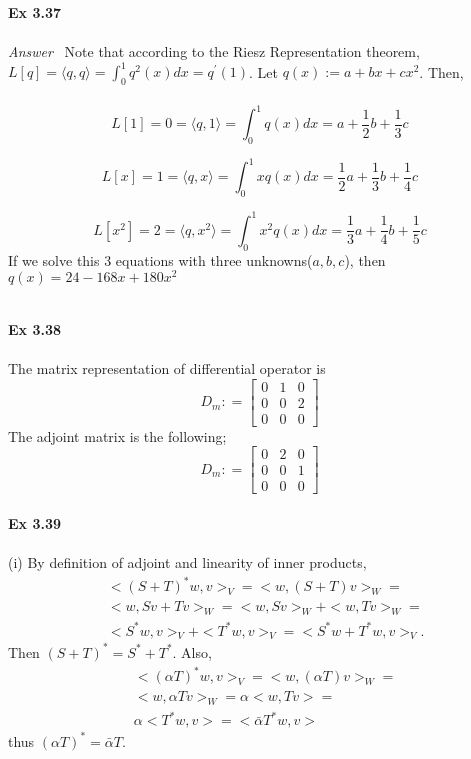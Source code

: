 \documentclass[letterpaper,12pt]{article}
\theoremstyle{definition}
\begin{document}
\begin{spacing}{1.3}{}
	
	\setlength{\leftskip}{10pt}
	
	\textbf{Ex 3.37} \\\\
	\emph{Answer} \ Note that according to the Riesz Representation theorem, $L[q] = \langle q,q \rangle = \int_{0}^{1} q^{2}(x)dx = q^{'}(1)$. Let $q(x) := a + bx + c x^2$. Then, \\\\
	\[L[1] = 0 =\langle q,1 \rangle = \int_{0}^{1} q(x)dx = a + \frac{1}{2}b + \frac{1}{3}c \]
	
	\[L[x] = 1 =\langle q,x \rangle = \int_{0}^{1} xq(x)dx = \frac{1}{2}a + \frac{1}{3}b + \frac{1}{4}c \]
	
	\[L[x^2] = 2 =\langle q,x^2 \rangle = \int_{0}^{1} x^2 q(x)dx = \frac{1}{3} a + \frac{1}{4}b + \frac{1}{5}c \]
	If we solve this 3 equations with three unknowns($a,b,c$), then
	$q(x) = 24 - 168x + 180 x^2$ \\\\
	
	\setlength{\leftskip}{10pt}
	
	\textbf{Ex 3.38} \\\\
	The matrix representation of differential operator is \\
	\[D_m : = \begin{bmatrix}
	0 & 1 & 0 \\
	0 & 0 & 2 \\
	0 & 0 & 0
	\end{bmatrix}\]
	The adjoint matrix is the following;
	\[D_m : = \begin{bmatrix}
	0 & 2 & 0 \\
	0 & 0 & 1 \\
	0 & 0 & 0
	\end{bmatrix}\]
	\setlength{\leftskip}{10pt}
	\\
	\textbf{Ex 3.39} \\\\
	(i)
	By definition of adjoint and linearity of inner products,
	\begin{align*}
	&<(S+T)^*w,v>_V  =
	<w,(S+T)v>_W  =\\
	&<w,Sv+Tv>_W  =
	<w,Sv>_W+<w,Tv>_W  =\\
	&<S^*w,v>_V + <T^*w,v>_V  =
	<S^*w+T^*w,v>_V.
	\end{align*}
	Then $(S+T)^*= S^*+T^*$.
	Also,
	\begin{align*}
	&<(\alpha T)^*w,v>_V  =
	<w,(\alpha T)v>_W  =\\
	&<w,\alpha Tv>_W  =
	\alpha<w, Tv>  =\\
	&\alpha<T^*w,v>  =
	<\bar{\alpha}T^*w,v>
	\end{align*}
	thus $(\alpha T)^*= \bar{\alpha}T$. \\\\
	

\end{spacing}
\end{document}
